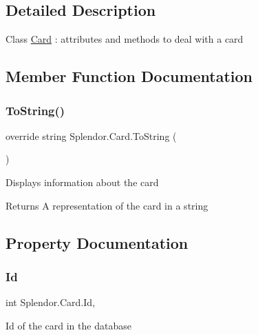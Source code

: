 \subsection{Detailed Description}
Class \hyperlink{class_splendor_1_1_card}{Card} \+: attributes and methods to deal with a card 



\subsection{Member Function Documentation}
\mbox{\label{class_splendor_1_1_card_a3403c28ee02b119ee5aae5bd10eee468}} 
\subsubsection{\texorpdfstring{To\+String()}{ToString()}}
{\footnotesize\ttfamily override string Splendor.\+Card.\+To\+String (\begin{DoxyParamCaption}{ }\end{DoxyParamCaption})}



Displays information about the card 

\begin{DoxyReturn}{Returns}
A representation of the card in a string
\end{DoxyReturn}


\subsection{Property Documentation}
\mbox{\label{class_splendor_1_1_card_a1f2c57b133f35a3471ae86c9dc1727f6}} 
\subsubsection{\texorpdfstring{Id}{Id}}
{\footnotesize\ttfamily int Splendor.\+Card.\+Id\hspace{0.3cm}{\ttfamily [get]}, {\ttfamily [set]}}



Id of the card in the database 

